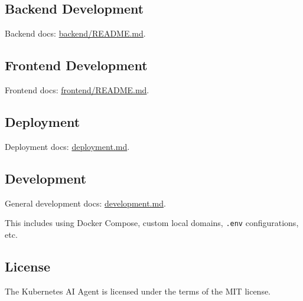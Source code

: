 \documentclass[
]{article}
\begin{document}
\hypertarget{backend-development}{%
\subsection{Backend Development}\label{backend-development}}

Backend docs: \href{./backend/README.md}{backend/README.md}.

\hypertarget{frontend-development}{%
\subsection{Frontend Development}\label{frontend-development}}

Frontend docs: \href{./frontend/README.md}{frontend/README.md}.

\hypertarget{deployment}{%
\subsection{Deployment}\label{deployment}}

Deployment docs: \href{./deployment.md}{deployment.md}.

\hypertarget{development}{%
\subsection{Development}\label{development}}

General development docs: \href{./development.md}{development.md}.

This includes using Docker Compose, custom local domains, \texttt{.env}
configurations, etc.

\hypertarget{license}{%
\subsection{License}\label{license}}

The Kubernetes AI Agent is licensed under the terms of the MIT license.
\end{document}
